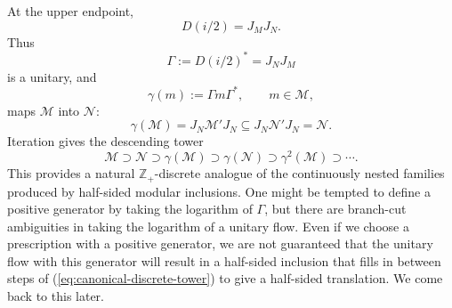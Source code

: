 \documentclass[a4paper,11pt]{article}
\theoremstyle{definition}
\begin{document}
At the upper endpoint,
\begin{equation}
    \boxed{
    D(i/2)=J_MJ_N .
    }
    \label{eq:D-half-common}
\end{equation}
Thus
\begin{equation}
    \Gamma:=D(i/2)^*=J_NJ_M
\end{equation}
is a unitary, and
\begin{equation}
    \gamma(m)
    :=
    \Gamma m\Gamma^*,
    \qquad
    m\in\mathcal M,
    \label{eq:canonical-endomorphism-common}
\end{equation}
maps $\mathcal M$ into $\mathcal N$:
\begin{equation}
    \gamma(\mathcal M)
    =
    J_N\mathcal M'J_N
    \subseteq
    J_N\mathcal N'J_N
    =
    \mathcal N .
\end{equation}
Iteration gives the descending tower
\begin{equation}
    \boxed{
    \mathcal M
    \supset
    \mathcal N
    \supset
    \gamma(\mathcal M)
    \supset
    \gamma(\mathcal N)
    \supset
    \gamma^2(\mathcal M)
    \supset\cdots .
    }
    \label{eq:canonical-discrete-tower}
\end{equation}
This provides a natural $\mathbb Z_+$-discrete analogue of the continuously
nested families produced by half-sided modular inclusions. One might be tempted to define a positive generator by taking the logarithm of $\Gamma$, but there are branch-cut ambiguities in taking the logarithm of a unitary flow. 
Even if we choose a prescription with a positive generator, we are not guaranteed that the unitary flow with this generator will result in a half-sided inclusion that fills in between steps of (\ref{eq:canonical-discrete-tower}) to give a half-sided translation. We come back to this later.
\end{document}
